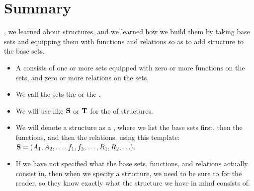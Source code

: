 \documentclass[../../../main.tex]{subfiles}
\begin{document}
\section{Summary}

, we learned about structures, and we learned how we build them by taking base sets and equipping them with functions and relations so as to add structure to the base sets.

\begin{itemize}

  \item A  consists of one or more sets equipped with zero or more functions on the sets, and zero or more relations on the sets. 
  
  \item We call the sets the  or the .
  
  \item We will use  like $\mathbf{S}$ or $\mathbf{T}$ for the  of structures. 
  
  \item We will denote a structure as a , where we list the base sets first, then the functions, and then the relations, using this template: $\mathbf{S} = (A_{1}, A_{2}, \ldots, f_{1}, f_{2}, \ldots, R_{1}, R_{2}, \ldots)$.
  
  \item If we have not specified what the base sets, functions, and relations actually consist in, then when we specify a structure, we need to be sure to  for the reader, so they know exactly what the structure we have in mind consists of.

\end{itemize}
\end{document}
